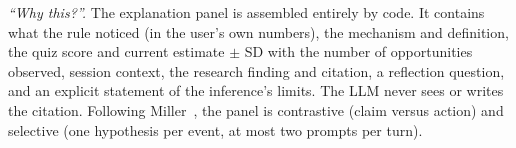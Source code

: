 \documentclass[conference]{IEEEtran}
\begin{document}
\textit{``Why this?''.} The explanation panel is assembled entirely by code. It contains what the rule noticed (in the user's own numbers), the mechanism and definition, the quiz score and current estimate \ensuremath{\pm} SD with the number of opportunities observed, session context, the research finding and citation, a reflection question, and an explicit statement of the inference's limits. The LLM never sees or writes the citation. Following Miller~\cite{miller19}, the panel is contrastive (claim versus action) and selective (one hypothesis per event, at most two prompts per turn).

\begin{figure}[t]
\centering
{}
\end{figure}
\end{document}
